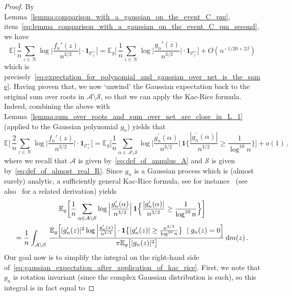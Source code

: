 \documentclass[11pt]{amsart}
\theoremstyle{remark}
\theoremstyle{definition}
\newcommand{\bE}{\mathbb E}
\newcommand{\cA}{\mathcal A}
\newcommand{\cC}{\mathcal C}
\newcommand{\cN}{\mathcal N}
\newcommand{\one}{\boldsymbol{1}}
\begin{document}
    \begin{proof}
        By Lemma~\ref{lemma:comparison_with_a_gaussian_on_the_event_C_pm}, item~\eqref{eq:lemma_comparison_with_a_gaussian_on_the_event_C_pm_second}, we have 
        \[
        \bE\bigg[ \,  \frac{1}{n} \sum_{z \in \cN} \log \Big|\frac{f_n'(z)}{n^{3/2}} \Big| \cdot \one_{\cC_z^+} \bigg] = \bE_g\bigg[ \,  \frac{1}{n} \sum_{z \in \cN} \log \Big|\frac{g_n'(z)}{n^{3/2}} \Big| \cdot \one_{\cC_z^+} \bigg] + O(n^{-1/20+2\beta})
        \]
        which is precisely~\eqref{eq:expectation_for_polynomial_and_gaussian_over_net_is_the_same}. Having proven that, we now `unwind' the Gaussian expectation back to the original sum over roots in $\mathcal{A}\setminus \mathcal{S}$, so that we can apply the Kac-Rice formula. Indeed, combining the above with Lemma~\ref{lemma:sum_over_roots_and_sum_over_net_are_close_in_L_1} (applied to the Gaussian polynomial $g_n$) yields that 
        \[
        \bE\bigg[ \,  \frac{2}{n} \sum_{z \in \cN} \log \Big|\frac{f_n'(z)}{n^{3/2}} \Big| \cdot \one_{\cC_z^+} \bigg] = \bE_g\bigg[\frac{1}{n} \sum_{\alpha\in \mathcal{A}\setminus \mathcal{S}} \log\Big|\frac{g_n^\prime(\alpha)}{n^{3/2}}\Big| \,  \one\Big\{\frac{|g_n^\prime(\alpha)|}{n^{3/2} } \ge \frac{1}{\log^{10}n}\Big\}\bigg] + o(1) \, ,
        \]
        where we recall that $\cA$ is given by~\eqref{eq:def_of_annulus_A} and $\mathcal{S}$ is given by~\eqref{eq:def_of_almost_real_R}. Since $g_n$ is a Gaussian process which is (almost surely) analytic, a sufficiently general Kac-Rice formula, see for instance~\cite[Theorem~6.4]{Azais-Wschebor} (see also~\cite[Appendix~A]{Michelen-Yakir-log-energy} for a related derivation) yields
        \begin{multline}
            \label{eq:gaussian_expectation_after_application_of_kac_rice}
            \bE_g\bigg[\frac{1}{n} \sum_{\alpha\in \mathcal{A}\setminus \mathcal{S}} \log\Big|\frac{g_n^\prime(\alpha)}{n^{3/2}}\Big| \,  \one\Big\{\frac{|g_n^\prime(\alpha)|}{n^{3/2} } \ge \frac{1}{\log^{10}n}\Big\}\bigg] \\  = \frac{1}{n}\int_{\mathcal{A}\setminus \mathcal{S}} \, \frac{\bE_g\Big[ |g_n^\prime(z)|^2 \log\Big|\frac{g_n^\prime(z)}{n^{3/2}}\Big| \cdot \one\big\{|g_n^\prime(z)|\ge\frac{n^{3/2}}{\log^{10}n} \big\} \ \mid g_n(z)=0\Big]}{\pi \bE_g\big[|g_n(z)|^2\big]}  \,  {\rm d}m(z) \, .
        \end{multline}
        Our goal now is to simplify the integral on the right-hand side of~\eqref{eq:gaussian_expectation_after_application_of_kac_rice}. First, we note that $g_n$ is rotation invariant (since the complex Gaussian distribution is such), so this integral is in fact equal to

\end{proof}
\end{document}

